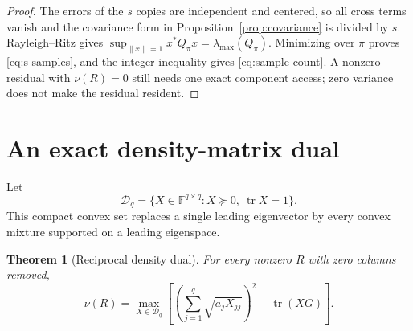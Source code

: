 \documentclass[11pt]{article}
\newtheorem{theorem}{Theorem}[section]
\theoremstyle{definition}
\newcommand{\F}{\mathbb F}
\newcommand{\D}{\mathcal D}
\newcommand{\tr}{\operatorname{tr}}
\newcommand{\norm}[1]{\left\lVert #1\right\rVert}
\begin{document}
\begin{proof}
The errors of the $s$ copies are independent and centered, so all cross terms vanish and the
covariance form in Proposition~\ref{prop:covariance} is divided by $s$.  Rayleigh--Ritz gives
$\sup_{\norm{x}=1}x^*Q_\pi x=\lambda_{\max}(Q_\pi)$.  Minimizing over $\pi$ proves
\eqref{eq:s-samples}, and the integer inequality gives \eqref{eq:sample-count}.  A nonzero
residual with $\nu(R)=0$ still needs one exact component access; zero variance does not make the
residual resident.
\end{proof}

\section{An exact density-matrix dual}

Let
\[
  \D_q=\{X\in\F^{q\times q}:X\succeq0,\ \tr X=1\}.
\]
This compact convex set replaces a single leading eigenvector by every convex mixture supported
on a leading eigenspace.

\begin{theorem}[Reciprocal density dual]
\label{thm:dual}
For every nonzero $R$ with zero columns removed,
\begin{equation}
  \boxed{
  \nu(R)=\max_{X\in\D_q}
  \left[
    \left(\sum_{j=1}^q\sqrt{a_jX_{jj}}\right)^2-\tr(XG)
  \right].}
  \label{eq:dual}
\end{equation}
\end{theorem}
\end{document}
